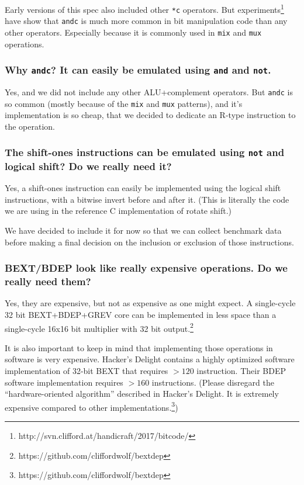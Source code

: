 Early versions of this spec also included other \texttt{*c} operators. But
experiments\footnote{http://svn.clifford.at/handicraft/2017/bitcode/} have show that
\texttt{andc} is much more common in bit manipulation code than any other operators.
Especially because it is commonly used in \texttt{mix} and \texttt{mux} operations.

\subsubsection{Why \texttt{andc}? It can easily be emulated using \texttt{and} and \texttt{not}.}

Yes, and we did not include any other ALU+complement operators. But \texttt{andc}
is so common (mostly because of the \texttt{mix} and \texttt{mux} patterns), and
it's implementation is so cheap, that we decided to dedicate an R-type instruction
to the operation.

\subsubsection{The shift-ones instructions can be emulated using {\tt not} and logical shift? Do we really need it?}

Yes, a shift-ones instruction can easily be implemented using the logical shift
instructions, with a bitwise invert before and after it. (This is literally the
code we are using in the reference C implementation of rotate shift.)

We have decided to include it for now so that we can collect benchmark data before
making a final decision on the inclusion or exclusion of those instructions.

\subsubsection{BEXT/BDEP look like really expensive operations. Do we really need them?}

Yes, they are expensive, but not as expensive as one might expect. A
single-cycle 32 bit BEXT+BDEP+GREV core can be implemented in less space than a
single-cycle 16x16 bit multiplier with 32 bit output.\footnote{https://github.com/cliffordwolf/bextdep}

It is also important to keep in mind that implementing those operations in
software is very expensive. Hacker's Delight contains a highly optimized
software implementation of 32-bit BEXT that requires $>120$ instruction. Their
BDEP software implementation requires $>160$ instructions. (Please disregard the
``hardware-oriented algorithm'' described in Hacker's Delight. It is
extremely expensive compared to other implementations.\footnote{https://github.com/cliffordwolf/bextdep})


